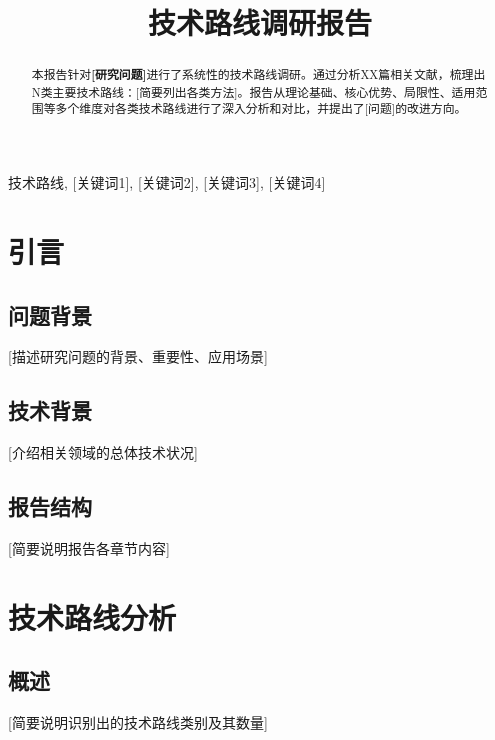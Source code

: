 \documentclass[journal]{IEEEtran}
\begin{document}
\title{技术路线调研报告}

\author{}

\maketitle

\begin{abstract}
本报告针对\textbf{[研究问题]}进行了系统性的技术路线调研。通过分析XX篇相关文献，梳理出N类主要技术路线：[简要列出各类方法]。报告从理论基础、核心优势、局限性、适用范围等多个维度对各类技术路线进行了深入分析和对比，并提出了[问题]的改进方向。
\end{abstract}

\begin{IEEEkeywords}
技术路线, [关键词1], [关键词2], [关键词3], [关键词4]
\end{IEEEkeywords}

\section{引言}

\subsection{问题背景}
[描述研究问题的背景、重要性、应用场景]

\subsection{技术背景}
[介绍相关领域的总体技术状况]

\subsection{报告结构}
[简要说明报告各章节内容]

\section{技术路线分析}

\subsection{概述}
[简要说明识别出的技术路线类别及其数量]
\end{document}
